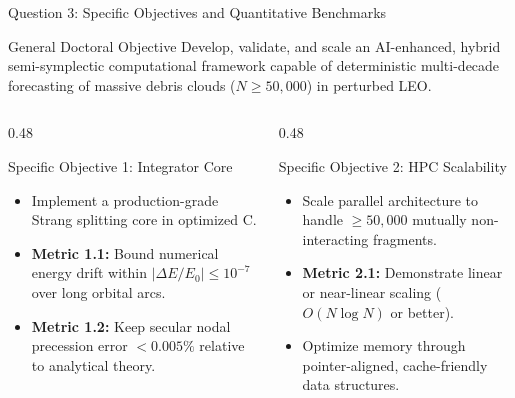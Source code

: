 \documentclass[aspectratio=169,10pt]{beamer}
\begin{document}
\begin{frame}{Question 3: Specific Objectives and Quantitative Benchmarks}
    \begin{block}{General Doctoral Objective}
        \small
        Develop, validate, and scale an AI-enhanced, hybrid semi-symplectic computational framework capable of deterministic multi-decade forecasting of massive debris clouds ($N \ge 50,000$) in perturbed LEO.
    \end{block}

    \vspace{0.1cm}

    \begin{columns}[t]
        \begin{column}{0.48\textwidth}
            \begin{exampleblock}{Specific Objective 1: Integrator Core}
                \small
                \begin{itemize}
                    \setlength{\itemsep}{2pt}
                    \item Implement a production-grade Strang splitting core in optimized C.
                    \item \textbf{Metric 1.1:} Bound numerical energy drift within $|\Delta E / E_0| \le 10^{-7}$ over long orbital arcs.
                    \item \textbf{Metric 1.2:} Keep secular nodal precession error $<0.005\%$ relative to analytical theory.
                \end{itemize}
            \end{exampleblock}
        \end{column}

        \begin{column}{0.48\textwidth}
            \begin{exampleblock}{Specific Objective 2: HPC Scalability}
                \small
                \begin{itemize}
                    \setlength{\itemsep}{2pt}
                    \item Scale parallel architecture to handle $\ge 50,000$ mutually non-interacting fragments.
                    \item \textbf{Metric 2.1:} Demonstrate linear or near-linear scaling ($O(N \log N)$ or better).
                    \item Optimize memory through pointer-aligned, cache-friendly data structures.
                \end{itemize}
            \end{exampleblock}
        \end{column}
    \end{columns}
\end{frame}
\end{document}
